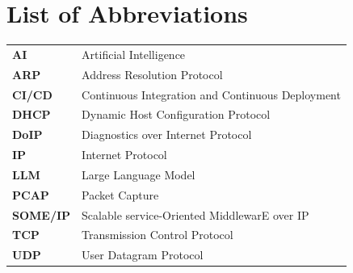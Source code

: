 \chapter*{List of Abbreviations}


\vspace{0.5cm}

\begin{center}
\begin{tabular}{p{}p{}}
\textbf{AI} & Artificial Intelligence \\[0.25cm]

\textbf{ARP} & Address Resolution Protocol \\[0.25cm]

\textbf{CI/CD} & Continuous Integration and Continuous Deployment \\[0.25cm]

\textbf{DHCP} & Dynamic Host Configuration Protocol \\[0.25cm]

\textbf{DoIP} & Diagnostics over Internet Protocol \\[0.25cm]

\textbf{IP} & Internet Protocol \\[0.25cm]

\textbf{LLM} & Large Language Model \\[0.25cm]

\textbf{PCAP} & Packet Capture \\[0.25cm]

\textbf{SOME/IP} & Scalable service-Oriented MiddlewarE over IP \\[0.25cm]

\textbf{TCP} & Transmission Control Protocol \\[0.25cm]

\textbf{UDP} & User Datagram Protocol
\end{tabular}
\end{center}